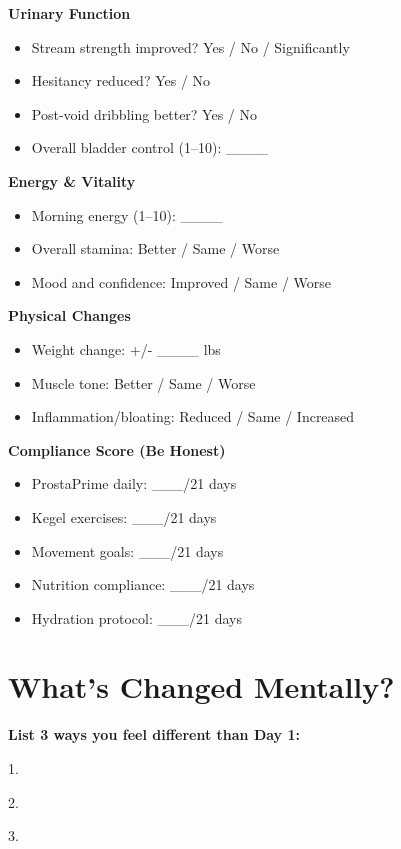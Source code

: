 \documentclass[11pt,oneside]{book}
\begin{document}
\textbf{Urinary Function}
\begin{itemize}[leftmargin=*]
\item Stream strength improved? Yes / No / Significantly
\item Hesitancy reduced? Yes / No
\item Post-void dribbling better? Yes / No
\item Overall bladder control (1--10): \_\_\_\_
\end{itemize}

\textbf{Energy \& Vitality}
\begin{itemize}[leftmargin=*]
\item Morning energy (1--10): \_\_\_\_
\item Overall stamina: Better / Same / Worse
\item Mood and confidence: Improved / Same / Worse
\end{itemize}

\textbf{Physical Changes}
\begin{itemize}[leftmargin=*]
\item Weight change: +/- \_\_\_\_ lbs
\item Muscle tone: Better / Same / Worse
\item Inflammation/bloating: Reduced / Same / Increased
\end{itemize}

\textbf{Compliance Score (Be Honest)}
\begin{itemize}[leftmargin=*]
\item ProstaPrime daily: \_\_\_/21 days
\item Kegel exercises: \_\_\_/21 days
\item Movement goals: \_\_\_/21 days
\item Nutrition compliance: \_\_\_/21 days
\item Hydration protocol: \_\_\_/21 days
\end{itemize}

\section*{What's Changed Mentally?}

\textbf{List 3 ways you feel different than Day 1:}

1. \underline{\hspace{10cm}}

2. \underline{\hspace{10cm}}

3. \underline{\hspace{10cm}}
\end{document}
